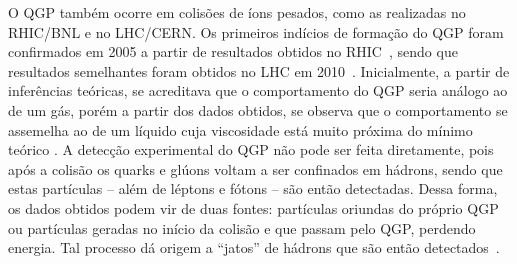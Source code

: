 O QGP também ocorre em colisões de íons pesados, como as realizadas no RHIC/BNL e no LHC/CERN. Os primeiros indícios de formação do QGP foram confirmados em 2005 a partir de resultados obtidos no RHIC~\parencite{QGP1}, sendo que resultados semelhantes foram obtidos no LHC em 2010~\parencite{QGP2}. Inicialmente, a partir de inferências teóricas, se acreditava que o comportamento do QGP seria análogo ao de um gás, porém a partir dos dados obtidos, se observa que o comportamento se assemelha ao de um líquido cuja viscosidade está muito próxima do mínimo teórico \parencite{QGP1}. A detecção experimental do QGP não pode ser feita diretamente, pois após a colisão os quarks e glúons voltam a ser confinados em hádrons, sendo que estas partículas -- além de léptons e fótons -- são então detectadas. Dessa forma, os dados obtidos podem vir de duas fontes: partículas oriundas do próprio QGP ou partículas geradas no início da colisão e que passam pelo QGP, perdendo energia. Tal processo dá origem a ``jatos'' de hádrons que são então detectados~\parencite{QGP3, QGP4}.

